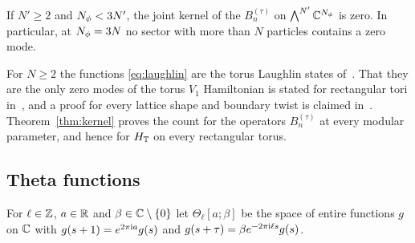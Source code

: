 \begin{proposition}\label{prop:overfill}
If $N'\ge2$ and $N_{\phi}<3N'$, the joint kernel of the $B^{(\tau)}_n$ on $\bigwedge^{N'}\mathbb{C}^{N_{\phi}}$ is zero. In particular, at
$N_{\phi}=3N$ no sector with more than $N$ particles contains a zero mode.
\end{proposition}

For $N\ge2$ the functions \eqref{eq:laughlin} are the torus Laughlin states of~\cite{HaldaneRezayiTorus}. That they are the
only zero modes of the torus $V_1$ Hamiltonian is stated for rectangular tori in~\cite[Section~II.2]{ONDS}, and a proof for
every lattice shape and boundary twist is claimed in~\cite{HouWu}. Theorem~\ref{thm:kernel} proves the count for the operators
$B_n^{(\tau)}$ at every modular parameter, and hence for $H_{\mathbb{T}}$ on every rectangular torus.

\subsection{Theta functions}

For $\ell\in\mathbb{Z}$, $a\in\mathbb{R}$ and $\beta\in\mathbb{C}\setminus\{0\}$ let $\Theta_\ell[a;\beta]$ be the space of entire functions $g$ on
$\mathbb{C}$ with $g(s+1)=e^{2\pi\mathrm{i} a}g(s)$ and $g(s+\tau)=\beta e^{-2\pi\mathrm{i}\ell s}g(s)$.

